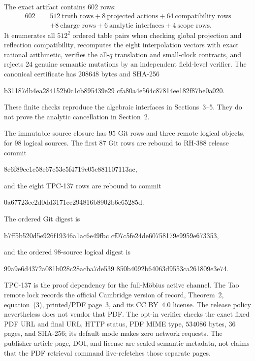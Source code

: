 \documentclass[11pt]{article}
\theoremstyle{definition}
\theoremstyle{remark}
\begin{document}
The exact artifact contains $602$ rows:
\[
 \begin{aligned}
 602={}&512\ \text{truth rows}+8\ \text{projected actions}
       +64\ \text{compatibility rows}\\
      &+8\ \text{charge rows}+6\ \text{analytic interfaces}
       +4\ \text{scope rows}.
 \end{aligned}
\]
It enumerates all $512^2$ ordered table pairs when checking global
projection and reflection compatibility, recomputes the eight interpolation
vectors with exact rational arithmetic, verifies the all-$q$ translation
and small-clock contracts, and rejects $24$ genuine semantic mutations by
an independent field-level verifier.  The canonical certificate has
$208648$ bytes and SHA-256
\begin{center}
\small\ttfamily
b31187db4ea284152b0c1cb895439e29\allowbreak
cfa80a4e564c87814ee182f87be0a020.
\end{center}
These finite checks reproduce the algebraic interfaces in
Sections~3--5.  They do not prove the analytic cancellation in Section~2.

The immutable source closure has $95$ Git rows and three remote logical
objects, for $98$ logical sources.  The first $87$ Git rows are rebound to
RH-388 release commit
\begin{center}
\small\ttfamily 8e6f89ee1e58e67c53c5f4719c05e881107113ac,
\end{center}
and the eight TPC-137 rows are rebound to commit
\begin{center}
\small\ttfamily 0a67723ee2d0dd3171ee294816b8902b6e65285d.
\end{center}
The ordered Git digest is
\begin{center}
\small\ttfamily
b7ff5b520d5e926f19346a1ac6e49fbc\allowbreak
cf07c5fe24de60758179e9959e673353,
\end{center}
and the ordered $98$-source logical digest is
\begin{center}
\small\ttfamily
99a9e6d4372a081b028c28acba7de539\allowbreak
850b4092b64063d9553ca261809e3e74.
\end{center}

TPC-137 is the proof dependency for the full-M\"obius active channel.  The
Tao remote lock records the official Cambridge version of record,
Theorem~2, equation~(3), printed/PDF page~3, and its CC BY~4.0 license.  The
release policy nevertheless does not vendor that PDF.  The opt-in verifier
checks the exact fixed PDF URL and final URL, HTTP status, PDF MIME type,
$534086$ bytes, $36$ pages, and SHA-256; its default mode makes zero network
requests.  The publisher article page, DOI, and license are sealed semantic
metadata, not claims that the PDF retrieval command live-refetches those
separate pages.
\end{document}
